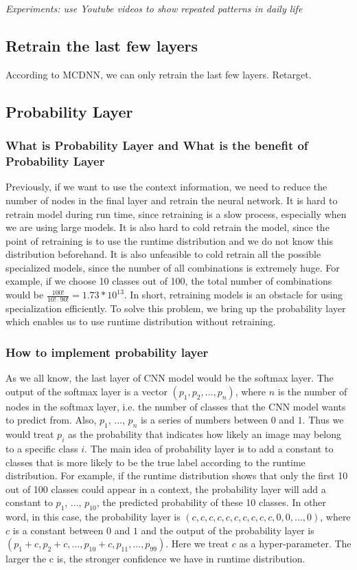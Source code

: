 \documentclass{article}
\begin{document}
\textit{Experiments: use Youtube videos to show repeated patterns in daily life}

\subsection{Retrain the last few layers}
According to MCDNN, we can only retrain the last few layers. Retarget.


\subsection{Probability Layer}
\subsubsection{What is Probability Layer and What is the benefit of Probability Layer}
Previously, if we want to use the context information, we need to reduce the number of nodes in the final layer and retrain the neural network. It is hard to retrain model during run time, since retraining is a slow process, especially when we are using large models. It is also hard to cold retrain the model, since the point of retraining is to use the runtime distribution and we do not know this distribution beforehand. It is also unfeasible to cold retrain all the possible specialized models, since the number of all combinations is extremely huge. For example, if we choose 10 classes out of 100, the total number of combinations would be $\frac{100!}{10! \cdot 90!} = 1.73*10^{13}$. In short, retraining models is an obstacle for using specialization efficiently. To solve this problem, we bring up the probability layer which enables us to use runtime distribution without retraining. 

\subsubsection{How to implement probability layer}
As we all know, the last layer of CNN model would be the softmax layer. The output of the softmax layer is a vector $(p_1, p_2, ..., p_n)$, where $n$ is the number of nodes in the softmax layer, i.e. the number of classes that the CNN model wants to predict from. Also, $p_1$, ..., $p_n$ is a series of numbers between $0$ and $1$. Thus we would treat $p_i$ as the probability that indicates how likely an image may belong to a specific class $i$. The main idea of probability layer is to add a constant to classes that is more likely to be the true label according to the runtime distribution. For example, if the runtime distribution shows that only the first 10 out of 100 classes could appear in a context, the probability layer will add a constant to $p_1$, ..., $p_{10}$, the predicted probability of these 10 classes. In other word, in this case, the probability layer is $(c, c, c, c, c, c, c, c, c, c, 0, 0, ..., 0)$, where $c$ is a constant between $0$ and $1$ and the output of the probability layer is $(p_1 + c, p_2 + c, ..., p_{10}+c, p_{11}, ..., p_{99})$. Here we treat $c$ as a hyper-parameter. The larger the c is, the stronger confidence we have in runtime distribution.
\end{document}
